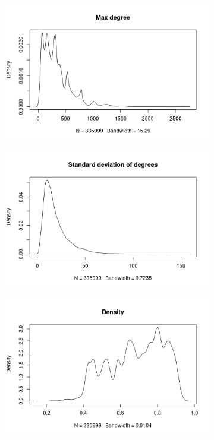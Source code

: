 \documentclass{l4proj}
\theoremstyle{definition}
\theoremstyle{remark}
\begin{document}
\begin{figure}
\begin{subfigure}[t]{0.49\textwidth}
  \end{subfigure}
  \begin{subfigure}[t]{0.49\textwidth}
    \centering
    \includegraphics[width=\textwidth]{images/maxdeg_density.png}
  \end{subfigure}
  \begin{subfigure}[t]{0.49\textwidth}
    \centering
    \includegraphics[width=\textwidth]{images/stddeg_density.png}
  \end{subfigure}
  \begin{subfigure}[t]{0.49\textwidth}
    \centering
    \includegraphics[width=\textwidth]{images/density_density.png}

\end{subfigure}
\end{figure}
\end{document}
